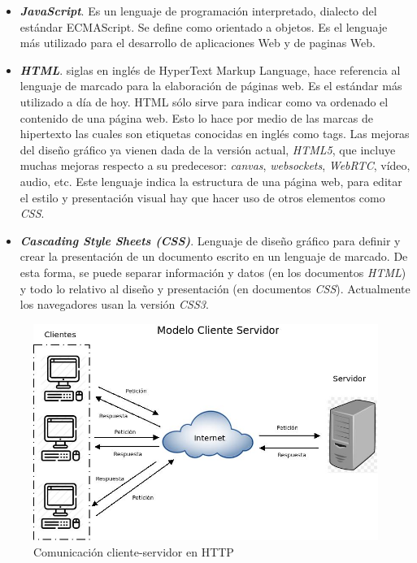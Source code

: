 \begin{itemize} 
    \item \textit{\textbf{JavaScript}}. Es un lenguaje de programación interpretado, dialecto del estándar ECMAScript. Se define como orientado a objetos. Es el lenguaje más utilizado para el desarrollo de aplicaciones Web y de paginas Web.
    \item \textit{\textbf{HTML}}. siglas en inglés de HyperText Markup Language, hace referencia al lenguaje de marcado para la elaboración de páginas web. Es el estándar más utilizado a día de hoy.\newline
HTML sólo sirve para indicar como va ordenado el contenido de una página web. Esto lo hace por medio de las marcas de hipertexto las cuales son etiquetas conocidas en inglés como tags. Las mejoras del diseño gráfico ya vienen dada de la versión actual, \textit{HTML5}, que incluye muchas mejoras respecto a su predecesor: \textit{canvas}, \textit{websockets}, \textit{WebRTC}, vídeo, audio, etc. Este lenguaje indica la estructura de una página web, para editar el estilo y presentación visual hay que hacer uso de otros elementos como \textit{CSS}.
    \item \textit{\textbf{Cascading Style Sheets (CSS)}}. Lenguaje de diseño gráfico para definir y crear la presentación de un documento escrito en un lenguaje de marcado. De esta forma, se puede separar información y datos (en los documentos \textit{HTML}) y todo lo relativo al diseño y presentación (en documentos \textit{CSS}). Actualmente los navegadores usan la versión \textit{CSS3}.

\end{itemize}

\begin{figure}[h]
\centering
\includegraphics[scale=0.4]{img/http.jpeg}
\caption{Comunicación cliente-servidor en HTTP} \label{fig:http}
\end{figure}
